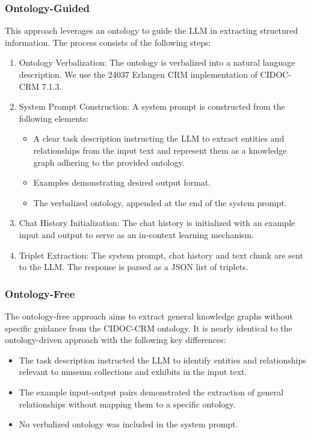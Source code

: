 \documentclass[a4, conference]{IEEEtran}
\begin{document}
\subsubsection{Ontology-Guided}

This approach leverages an ontology to guide the LLM in extracting structured information. The process consists of the following steps:

\begin{enumerate}
    \item Ontology Verbalization: The ontology is verbalized into a natural language description. We use the 24037 Erlangen CRM implementation of CIDOC-CRM 7.1.3.
    \item System Prompt Construction: A system prompt is constructed from the following elements:
          \begin{itemize}
              \item A clear task description instructing the LLM to extract entities and relationships from the input text and represent them as a knowledge graph adhering to the provided ontology.
              \item Examples demonstrating desired output format.
              \item The verbalized ontology, appended at the end of the system prompt.
          \end{itemize}
    \item Chat History Initialization: The chat history is initialized with an example input and output to serve as an in-context learning mechanism.
    \item Triplet Extraction: The system prompt, chat history and text chunk are sent to the LLM. The response is parsed as a JSON list of triplets.
\end{enumerate}

\subsubsection{Ontology-Free}

The ontology-free approach aims to extract general knowledge graphs without specific guidance from the CIDOC-CRM ontology. It is nearly identical to the ontology-driven approach with the following key differences:

\begin{itemize}
    \item The task description instructed the LLM to identify entities and relationships relevant to museum collections and exhibits in the input text.
    \item The example input-output pairs demonstrated the extraction of general relationships without mapping them to a specific ontology.
    \item No verbalized ontology was included in the system prompt.
\end{itemize}
\end{document}
